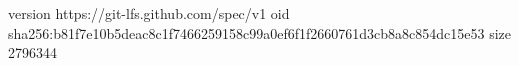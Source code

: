 version https://git-lfs.github.com/spec/v1
oid sha256:b81f7e10b5deac8c1f7466259158c99a0ef6f1f2660761d3cb8a8c854dc15e53
size 2796344
